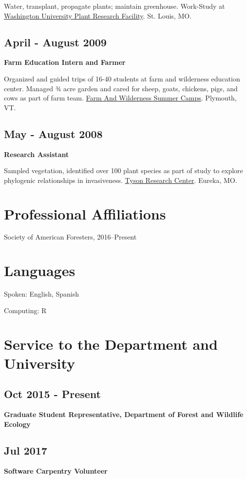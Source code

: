 \documentclass[11pt, sans]{moderncv}
\begin{document}
Water, transplant, propagate plants; maintain greenhouse. Work-Study
at \href{http://biology4.wustl.edu/greenhouse/index.html}{Washington University Plant Research Facility}. St. Louis, MO.

\subsection*{April - August 2009}
\label{sec:orgad69125}
\textbf{Farm Education Intern and Farmer}

Organized and guided trips of 16-40 students at farm and wilderness
education center. Managed 3⁄4 acre garden and cared for sheep, goats,
chickens, pigs, and cows as part of farm team.  \href{https://farmandwilderness.org/}{Farm And Wilderness
Summer Camps}. Plymouth, VT.

\subsection*{May - August 2008}
\label{sec:orgaaca72a}
\textbf{Research Assistant}

Sampled vegetation, identified over 100 plant species as part of study
to explore phylogenic relationships in invasiveness.  \href{https://tyson.wustl.edu/2008}{Tyson Research
Center}. Eureka, MO.
\section*{Professional Affiliations}
\label{sec:org3c88f89}
Society of American Foresters, 2016--Present

\section*{Languages}
\label{sec:org6f4139a}
Spoken: English, Spanish

Computing: R

\section*{Service to the Department and University}
\label{sec:orgea80d10}
\subsection*{Oct 2015 - Present}
\label{sec:orgcd5e7a7}
\textbf{Graduate Student Representative, Department of Forest and Wildlife
Ecology}
\subsection*{Jul 2017}
\label{sec:orgd800b70}
\textbf{Software Carpentry Volunteer}
\end{document}
